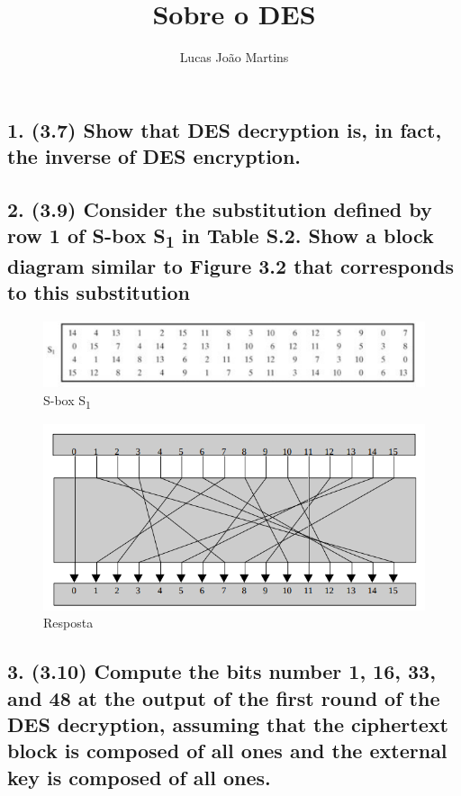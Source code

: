 \documentclass[12pt]{article}
\title{Sobre o DES}
\author{Lucas João Martins}
\date{}
\begin{document}
\maketitle

\section*{}
\subsection*{1. (3.7) Show that DES decryption is, in fact, the inverse of DES
encryption.}

\subsection*{2. (3.9) Consider the substitution defined by row 1 of S-box
S\textsubscript{1} in Table S.2. Show a block diagram similar to Figure 3.2 that
corresponds to this substitution}

  \begin{figure}[h]
    \includegraphics[width=\linewidth]{des_block_substitution}
    \caption{S-box S\textsubscript{1}}
  \end{figure}

  \begin{figure}[h]
    \includegraphics[width=\linewidth]{des_block_diagram}
    \caption{Resposta}
  \end{figure}

\subsection*{3. (3.10) Compute the bits number 1, 16, 33, and 48 at the output
of the first round of the DES decryption, assuming that the ciphertext block is
composed of all ones and the external key is composed of all ones.}
\end{document}
